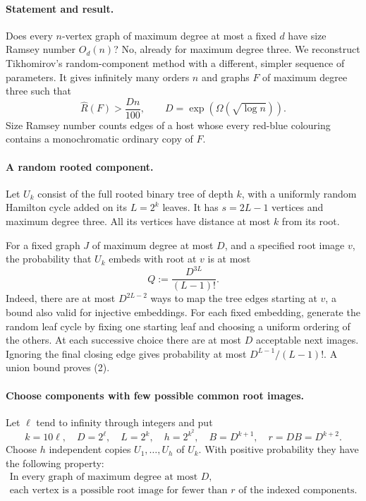 \paragraph{Statement and result.}
Does every \(n\)-vertex graph of maximum degree at most a fixed
\(d\) have size Ramsey number \(O_d(n)\)? No, already for maximum
degree three. We reconstruct Tikhomirov's random-component method
with a different, simpler sequence of parameters. It gives infinitely
many orders \(n\) and graphs \(F\) of maximum degree three such that
\[
 \widehat R(F)>\frac{Dn}{100},\qquad
 D=\exp(\Omega(\sqrt{\log n})). \tag{1}
\]
Size Ramsey number counts edges of a host whose every red-blue
colouring contains a monochromatic ordinary copy of \(F\).

\paragraph{A random rooted component.}
Let \(U_k\) consist of the full rooted binary tree of depth \(k\),
with a uniformly random Hamilton cycle added on its \(L=2^k\)
leaves. It has \(s=2L-1\) vertices and maximum degree three.
All its vertices have distance at most \(k\) from its root.

For a fixed graph \(J\) of maximum degree at most \(D\), and a
specified root image \(v\), the probability that \(U_k\) embeds
with root at \(v\) is at most
\[
 Q:=\frac{D^{3L}}{(L-1)!}. \tag{2}
\]
Indeed, there are at most \(D^{2L-2}\) ways to map the tree edges
starting at \(v\), a bound also valid for injective embeddings.
For each fixed embedding, generate the random leaf cycle by fixing
one starting leaf and choosing a uniform ordering of the others.
At each successive choice there are at most \(D\) acceptable next
images. Ignoring the final closing edge gives probability at most
\(D^{L-1}/(L-1)!\). A union bound proves (2).

\paragraph{Choose components with few possible common root images.}
Let \(\ell\) tend to infinity through integers and put
\[
 k=10\ell,\quad D=2^\ell,\quad L=2^k,\quad
 h=2^{k^2},\quad B=D^{k+1},\quad r=DB=D^{k+2}.
\]
Choose \(h\) independent copies \(U_1,\ldots,U_h\) of \(U_k\).
With positive probability they have the following property:
\[
 \begin{gathered}
 \text{In every graph of maximum degree at most }D,\\
 \text{each vertex is a possible root image for fewer than }r
 \text{ of the indexed components.}
 \end{gathered} \tag{3}
\]

